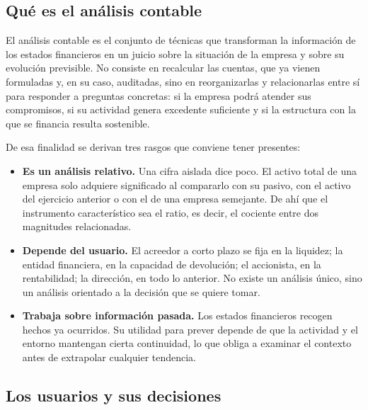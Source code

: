 \documentclass[12pt]{book} %
\providecommand{\tightlist}{%
  \setlength{\itemsep}{0pt}\setlength{\parskip}{0pt}}
\begin{document}
\hypertarget{quuxe9-es-el-anuxe1lisis-contable}{%
\subsection{Qué es el análisis
contable}\label{quuxe9-es-el-anuxe1lisis-contable}}

El análisis contable es el conjunto de técnicas que transforman la
información de los estados financieros en un juicio sobre la situación
de la empresa y sobre su evolución previsible. No consiste en recalcular
las cuentas, que ya vienen formuladas y, en su caso, auditadas, sino en
reorganizarlas y relacionarlas entre sí para responder a preguntas
concretas: si la empresa podrá atender sus compromisos, si su actividad
genera excedente suficiente y si la estructura con la que se financia
resulta sostenible.

De esa finalidad se derivan tres rasgos que conviene tener presentes:

\begin{itemize}
\tightlist
\item
  \textbf{Es un análisis relativo.} Una cifra aislada dice poco. El
  activo total de una empresa solo adquiere significado al compararlo
  con su pasivo, con el activo del ejercicio anterior o con el de una
  empresa semejante. De ahí que el instrumento característico sea el
  ratio, es decir, el cociente entre dos magnitudes relacionadas.
\item
  \textbf{Depende del usuario.} El acreedor a corto plazo se fija en la
  liquidez; la entidad financiera, en la capacidad de devolución; el
  accionista, en la rentabilidad; la dirección, en todo lo anterior. No
  existe un análisis único, sino un análisis orientado a la decisión que
  se quiere tomar.
\item
  \textbf{Trabaja sobre información pasada.} Los estados financieros
  recogen hechos ya ocurridos. Su utilidad para prever depende de que la
  actividad y el entorno mantengan cierta continuidad, lo que obliga a
  examinar el contexto antes de extrapolar cualquier tendencia.
\end{itemize}

\hypertarget{los-usuarios-y-sus-decisiones}{%
\subsection{Los usuarios y sus
decisiones}\label{los-usuarios-y-sus-decisiones}}
\end{document}
